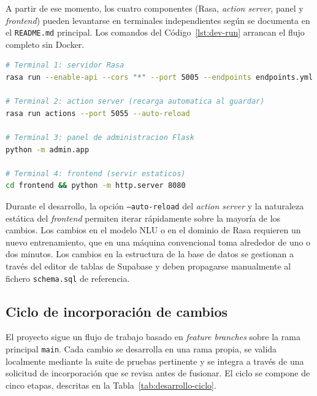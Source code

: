 A partir de ese momento, los cuatro componentes (Rasa, \textit{action server}, panel y \textit{frontend}) pueden levantarse en terminales independientes según se documenta en el \texttt{README.md} principal. Los comandos del Código~\ref{lst:dev-run} arrancan el flujo completo sin Docker.

\begin{lstlisting}[language=bash, caption={Arranque de los componentes en modo desarrollo.}, label={lst:dev-run}]
# Terminal 1: servidor Rasa
rasa run --enable-api --cors "*" --port 5005 --endpoints endpoints.yml

# Terminal 2: action server (recarga automatica al guardar)
rasa run actions --port 5055 --auto-reload

# Terminal 3: panel de administracion Flask
python -m admin.app

# Terminal 4: frontend (servir estaticos)
cd frontend && python -m http.server 8080
\end{lstlisting}

Durante el desarrollo, la opción \texttt{--auto-reload} del \textit{action server} y la naturaleza estática del \textit{frontend} permiten iterar rápidamente sobre la mayoría de los cambios. Los cambios en el modelo NLU o en el dominio de Rasa requieren un nuevo entrenamiento, que en una máquina convencional toma alrededor de uno o dos minutos. Los cambios en la estructura de la base de datos se gestionan a través del editor de tablas de Supabase y deben propagarse manualmente al fichero \texttt{schema.sql} de referencia.

\subsection{Ciclo de incorporación de cambios}\label{subsec:desarrollo-ciclo}

El proyecto sigue un flujo de trabajo basado en \textit{feature branches} sobre la rama principal \texttt{main}. Cada cambio se desarrolla en una rama propia, se valida localmente mediante la suite de pruebas pertinente y se integra a través de una solicitud de incorporación que se revisa antes de fusionar. El ciclo se compone de cinco etapas, descritas en la Tabla~\ref{tab:desarrollo-ciclo}.

